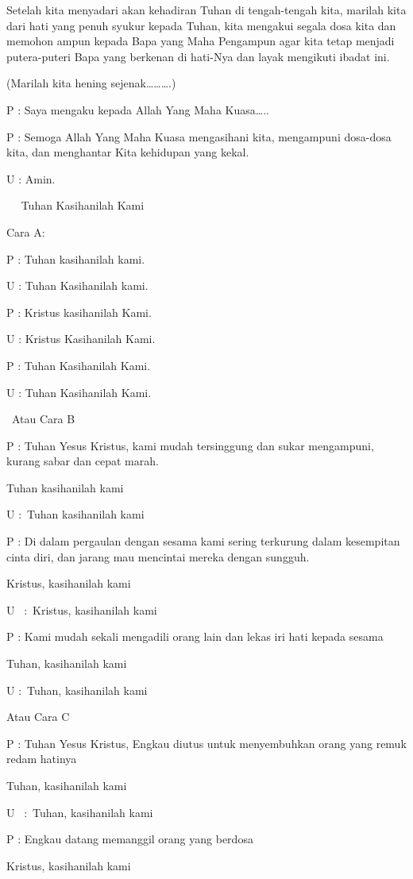 \documentclass{article}
\begin{document}
Setelah kita menyadari akan kehadiran Tuhan di tengah-tengah kita, marilah kita dari hati yang penuh syukur kepada
Tuhan, kita mengakui segala dosa kita dan memohon ampun kepada Bapa yang Maha Pengampun agar kita tetap menjadi
putera-puteri Bapa yang berkenan di hati-Nya dan layak mengikuti ibadat ini.

(Marilah kita hening sejenak{\dots}{\dots}{\dots}.)

P : Saya mengaku kepada Allah Yang Maha Kuasa{\dots}..

P : Semoga Allah Yang Maha Kuasa mengasihani kita, mengampuni dosa-dosa kita, dan menghantar Kita kehidupan yang kekal.

U : Amin.

~ ~Tuhan Kasihanilah Kami

Cara A:

P : Tuhan kasihanilah kami.

U : Tuhan Kasihanilah kami.

P : Kristus kasihanilah Kami.

U : Kristus Kasihanilah Kami.

P : Tuhan Kasihanilah Kami.

U : Tuhan Kasihanilah Kami.

~Atau Cara B

P : Tuhan Yesus Kristus, kami mudah tersinggung dan sukar mengampuni, kurang sabar dan cepat marah.

Tuhan kasihanilah kami

U :~Tuhan kasihanilah kami

P : Di dalam pergaulan dengan sesama kami sering terkurung dalam kesempitan cinta diri, dan jarang mau mencintai mereka
dengan sungguh.

Kristus, kasihanilah kami

U~ :~Kristus, kasihanilah kami

P : Kami mudah sekali mengadili orang lain dan lekas iri hati kepada sesama

Tuhan, kasihanilah kami

U :~Tuhan, kasihanilah kami

Atau Cara C

P : Tuhan Yesus Kristus, Engkau diutus untuk menyembuhkan orang yang remuk redam hatinya

Tuhan, kasihanilah kami

U~ :~Tuhan, kasihanilah kami

P : Engkau datang memanggil orang yang berdosa

Kristus, kasihanilah kami
\end{document}
